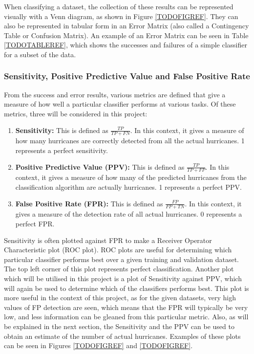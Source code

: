 \documentclass[pdftex,12pt,a4paper]{report}
\begin{document}
When classifying a dataset, the collection of these results can be represented visually with a Venn
diagram, as shown in Figure \ref{TODOFIGREF}. They can also be represented in tabular form in an
Error Matrix (also called a Contingency Table or Confusion Matrix). An example of an Error Matrix
can be seen in Table \ref{TODOTABLEREF}, which shows the successes and failures of a simple
classifier for a subset of the data.



\subsubsection{Sensitivity, Positive Predictive Value and False Positive Rate}

From the success and error results, various metrics are defined that give a measure of how well a
particular classifier performs at various tasks. Of these metrics, three will be considered in this
project:

\begin{enumerate}
    \item \textbf{Sensitivity:} This is defined as $\frac{TP}{TP + FN}$. In this context, it gives a
        measure of how many hurricanes are correctly detected from all the actual hurricanes. 1
        represents a perfect sensitivity.
    \item \textbf{Positive Predictive Value (PPV):} This is defined as $\frac{TP}{TP + FP}$. In this
        context, it gives a measure of how many of the predicted hurricanes from the classification
        algorithm are actually hurricanes. 1 represents a perfect PPV.
    \item \textbf{False Positive Rate (FPR):} This is defined as $\frac{FP}{FP + TN}$. In this
        context, it gives a measure of the detection rate of all actual hurricanes. 0 represents a
        perfect FPR.
\end{enumerate}

Sensitivity is often plotted against FPR to make a Receiver Operator Characteristic plot (ROC plot).
ROC plots are useful for determining which particular classifier performs best over a given training
and validation dataset. The top left corner of this plot represents perfect classification.  Another
plot which will be utilised in this project is a plot of Sensitivity against PPV, which will again
be used to determine which of the classifiers performs best. This plot is more useful in the context
of this project, as for the given datasets, very high values of FP detection are seen, which means
that the FPR will typically be very low, and less information can be gleaned from this particular
metric. Also, as will be explained in the next section, the Sensitivity and the PPV can be used to
obtain an estimate of the number of actual hurricanes. Examples of these plots can be seen in
Figures \ref{TODOFIGREF} and \ref{TODOFIGREF}.
\end{document}
